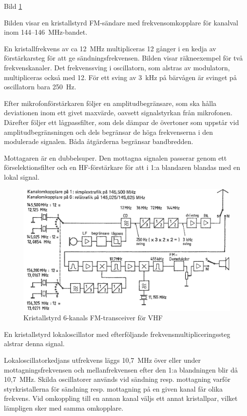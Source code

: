 Bild \ref{fig:bildII5-12}

Bilden visar en kristallstyrd FM-sändare med frekvensomkopplare för
kanalval inom 144--146~MHz-bandet.

En kristallfrekvens av ca 12~MHz multipliceras 12 gånger i en kedja
av förstärkarsteg för att ge sändningsfrekvensen. Bilden visar
räkneexempel för två frekvenskanaler. Det frekvenssving i oscillatorn,
som alstras av modulatorn, multipliceras också med 12. För ett sving
av 3~kHz på bärvågen är svinget på oscillatorn bara 250~Hz.

Efter mikrofonförstärkaren följer en amplitudbegränsare, som ska
hålla deviationen inom ett givet maxvärde, oavsett signalstyrkan från
mikrofonen. Därefter följer ett lågpassfilter, som dels dämpar de
övertoner som uppstår vid amplitudbegränsningen och dels begränsar de
höga frekvenserna i den modulerade signalen. Båda åtgärderna begränsar
bandbredden.

Mottagaren är en dubbelsuper. Den mottagna signalen passerar genom ett
förselektionsfilter och en HF-förstärkare för att i 1:a blandaren
blandas med en lokal signal.

\begin{figure}
  \includegraphics[width=\textwidth]{images/bild_2_5-12.png}
  \caption{Kristallstyrd 6-kanals FM-transceiver för VHF}
  \label{fig:bildII5-12}
\end{figure}



En kristallstyrd lokaloscillator med efterföljande
frekvensmultipliceringssteg alstrar denna signal.

Lokaloscillatorkedjans utfrekvens läggs 10,7~MHz över eller under
mottagningsfrekvensen och mellanfrekvensen efter den 1:a blandningen
blir då 10,7~MHz. Skilda oscillatorer används vid sändning
resp. mottagning varför styrkristallerna för sändning resp.
mottagning på en given kanal får olika frekvens. Vid omkoppling till
en annan kanal väljs ett annat kristallpar, vilket lämpligen sker med
samma omkopplare.

